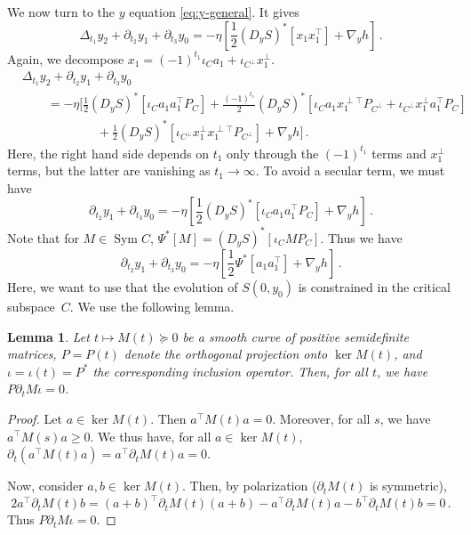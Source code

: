 \documentclass[11pt,english,reqno]{article}
\DeclareMathOperator{\Sym}{Sym}
\renewcommand{\geq}{\geqslant}
\theoremstyle{plain}
\newtheorem{lem}[proposition]{Lemma}
\theoremstyle{definition}
\theoremstyle{remark}
\numberwithin{equation}{section}
\begin{document}
    We now turn to the $y$ equation \eqref{eq:y-general}. It gives
    \begin{equation*}
        \Delta_{t_1} y_2 + \partial_{t_2} y_1 + \partial_{t_3} y_0 = - \eta \left[\frac{1}{2} (D_y S)^*[x_1 x_1^\top] + \nabla_y h\right] \, .
    \end{equation*}
    Again, we decompose $x_1 = (-1)^{t_1} \iota_C a_1 + \iota_{C^\perp} x_1^\perp$. 
    \begin{align*}
        &\Delta_{t_1} y_2 + \partial_{t_2} y_1 + \partial_{t_3} y_0 \\
        &\qquad= - \eta \bigg[\frac{1}{2} (D_y S)^*[\iota_C a_1 a_1^\top P_C] + \frac{(-1)^{t_1}}{2} (D_y S)^*\left[\iota_C a_1 x_1^{\perp \top} P_{C^\perp} + \iota_{C^\perp} x_1^\perp a_1^\top P_C\right] \\
        &\qquad\qquad\qquad+ \frac{1}{2} (D_y S)^*[\iota_{C^\perp} x_1^\perp x_1^{\perp \top} P_{C^\perp}] + \nabla_y h\bigg] \, .
    \end{align*}
    Here, the right hand side depends on $t_1$ only through the $(-1)^{t_1}$ terms and $x_1^\perp$ terms, but the latter are vanishing as $t_1 \to \infty$. To avoid a secular term, we must have
    \begin{equation*}
        \partial_{t_2} y_1 + \partial_{t_3} y_0 = - \eta \left[\frac{1}{2} (D_y S)^*[\iota_C a_1 a_1^\top P_C] + \nabla_y h\right] \, .
    \end{equation*}
    Note that for $M \in \Sym C$, $\Psi^*[M] = (D_y S)^*[\iota_CMP_C]$. Thus we have 
    \begin{equation}
        \label{eq:aux-3}
        \partial_{t_2} y_1 + \partial_{t_3} y_0 = - \eta \left[\frac{1}{2} \Psi^*[a_1 a_1^\top] + \nabla_y h\right] \, .
    \end{equation}
    Here, we want to use that the evolution of $S(0,y_0)$ is constrained in the critical subspace~$C$. We use the following lemma. 

    \begin{lem}
        Let $t \mapsto M(t) \succcurlyeq 0$ be a smooth curve of positive semidefinite matrices, $P = P(t)$ denote the orthogonal projection onto $\ker M(t)$, and $\iota = \iota(t) = P^*$ the corresponding inclusion operator. Then, for all $t$, we have $P \partial_t M \iota = 0$.
    \end{lem}

    \begin{proof}
        Let $a \in \ker M(t)$. Then $a^\top M(t) a = 0$. Moreover, for all $s$, we have $a^\top M(s) a \geq 0$. We thus have, for all $a \in \ker M(t)$, $\partial_t (a^\top M(t) a) = a^\top \partial_t M(t) a = 0$. 

        Now, consider $a, b \in \ker M(t)$. Then, by polarization ($\partial_t M(t)$ is symmetric),
        \begin{equation*}
            2 a^\top \partial_t M(t) b = (a + b)^\top \partial_t M(t) (a + b) - a^\top \partial_t M(t) a - b^\top \partial_t M(t) b = 0 \, .
        \end{equation*}
        Thus $P \partial_t M \iota = 0$.
    \end{proof}
\end{document}
